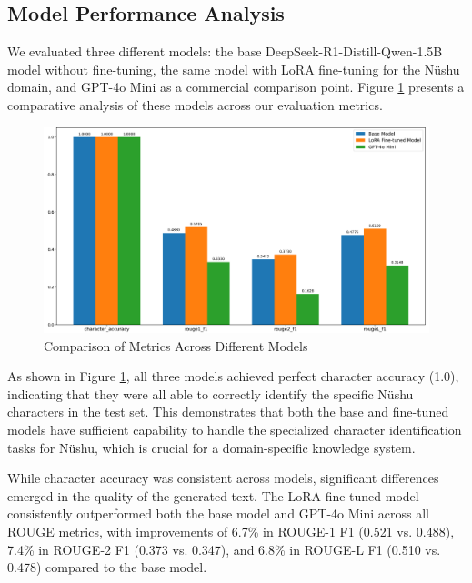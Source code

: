 \documentclass{article}
\begin{document}

\subsection{Model Performance Analysis}
\label{ssec:perf_analysis}

We evaluated three different models: the base DeepSeek-R1-Distill-Qwen-1.5B model without fine-tuning, the same model with LoRA fine-tuning for the N\"{u}shu domain, and GPT-4o Mini as a commercial comparison point. Figure \ref{fig:metrics_comparison} presents a comparative analysis of these models across our evaluation metrics.

\begin{figure}[htb]
\centering
\includegraphics[width=\textwidth]{images/metrics_comparison.png}
\caption{Comparison of Metrics Across Different Models}
\label{fig:metrics_comparison}
\end{figure}
As shown in Figure \ref{fig:metrics_comparison}, all three models achieved perfect character accuracy (1.0), indicating that they were all able to correctly identify the specific N\"{u}shu characters in the test set. This demonstrates that both the base and fine-tuned models have sufficient capability to handle the specialized character identification tasks for N\"{u}shu, which is crucial for a domain-specific knowledge system.

While character accuracy was consistent across models, significant differences emerged in the quality of the generated text. The LoRA fine-tuned model consistently outperformed both the base model and GPT-4o Mini across all ROUGE metrics, with improvements of 6.7\% in ROUGE-1 F1 (0.521 vs. 0.488), 7.4\% in ROUGE-2 F1 (0.373 vs. 0.347), and 6.8\% in ROUGE-L F1 (0.510 vs. 0.478) compared to the base model.
\end{document}
